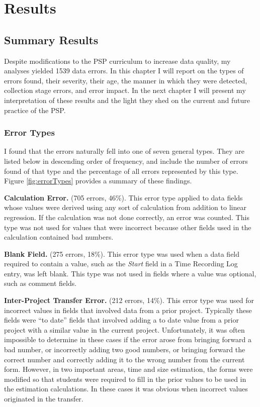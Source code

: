 
\chapter{Results}


\section{Summary Results}

Despite modifications to the PSP curriculum to increase data quality, my
analyses yielded 1539 data errors.  In this chapter I will report on the
types of errors found, their severity, their age, the manner in which they
were detected, collection stage errors, and error impact.  In the next
chapter I will present my interpretation of these results and the light
they shed on the current and future practice of the PSP.

\subsection{Error Types}
I found that the errors naturally fell into one of seven general types.
They are listed below in descending order of frequency, and include the
number of errors found of that type and the percentage of all errors
represented by this type.  Figure \ref{fig:errorTypes} provides a summary
of these findings.

{\bf Calculation Error.} (705 errors, 46\%). 
This error type applied to data fields whose values were derived using any
sort of calculation from addition to linear regression.  If the calculation
was not done correctly, an error was counted.  This type was not used for
values that were incorrect because other fields used in the calculation
contained bad numbers.

{\bf Blank Field.} (275 errors, 18\%).
This error type was used when a data field required to contain a value,
such as the {\it Start} field in a Time Recording Log entry, was left
blank.  This type was not used in fields where a value was optional, such
as comment fields.

{\bf Inter-Project Transfer Error.} (212 errors, 14\%).  
This error type was used for incorrect values in fields that involved data
from a prior project.  Typically these fields were ``to date'' fields that
involved adding a to date value from a prior project with a similar value
in the current project.  Unfortunately, it was often impossible to
determine in these cases if the error arose from bringing forward a bad
number, or incorrectly adding two good numbers, or bringing forward the
correct number and correctly adding it to the wrong number from the current
form.  However, in two important areas, time and size estimation, the forms
were modified so that students were required to fill in the prior values to
be used in the estimation calculations. In these cases it was obvious when
incorrect values originated in the transfer.
 

